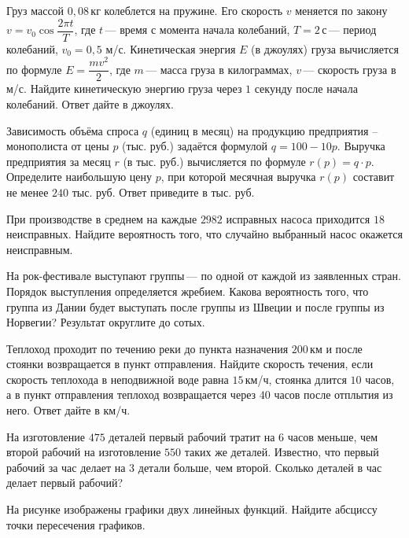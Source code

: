 \begin{listofex}
\begin{enumcols}[itemcolumns=1]
	\end{enumcols}
	\item Груз массой \(0,08\) кг колеблется на пружине. Его скорость \(v\) меняется по закону \( v = v_0 \cos{\dfrac{2\pi t}{T}}\), где \(t\) — время с момента начала колебаний, \(T = 2\) с — период колебаний, \(v_0=0,5\) м/с. Кинетическая энергия \(E\) (в джоулях) груза вычисляется по формуле \(E=\dfrac{mv^2}{2}\), где \(m\) — масса груза в килограммах, \(v\) — скорость груза в м/с. Найдите кинетическую энергию груза через \(1\) секунду после начала колебаний. Ответ дайте в джоулях.
	\item Зависимость объёма спроса \( q \) (единиц в месяц) на продукцию предприятия – монополиста от цены \( p \) (тыс. руб.) задаётся формулой \( q=100-10p \). Выручка предприятия за месяц \( r \) (в тыс. руб.) вычисляется по формуле \( r(p)=q\cdot p \). Определите наибольшую цену \( p \), при которой месячная выручка \( r(p) \) составит не менее \( 240 \) тыс. руб. Ответ приведите в тыс. руб.
	\item При производстве в среднем на каждые \(2982\) исправных насоса приходится \(18\) неисправных. Найдите вероятность того, что случайно выбранный насос окажется неисправным.
	\item На рок-фестивале выступают группы — по одной от каждой из заявленных стран. Порядок выступления определяется жребием. Какова вероятность того, что группа из Дании будет выступать после группы из Швеции и после группы из Норвегии? Результат округлите до сотых.
	\item Теплоход проходит по течению реки до пункта назначения \(200\) км и после стоянки возвращается в пункт отправления. Найдите скорость течения, если скорость теплохода в неподвижной воде равна \(15\) км/ч, стоянка длится \(10\) часов, а в пункт отправления теплоход возвращается через \(40\) часов после отплытия из него. Ответ дайте в км/ч.
	\item На изготовление \(475\) деталей первый рабочий тратит на \(6\) часов меньше, чем второй рабочий на изготовление \(550\) таких же деталей. Известно, что первый рабочий за час делает на \(3\) детали больше, чем второй. Сколько деталей в час делает первый рабочий?
	\item \begin{minipage}[t]{0.66\textwidth}
		На рисунке изображены графики двух линейных функций. Найдите абсциссу точки пересечения графиков.
	\end{minipage}
	\begin{minipage}[c]{0.3\textwidth}

\end{minipage}
\end{listofex}
